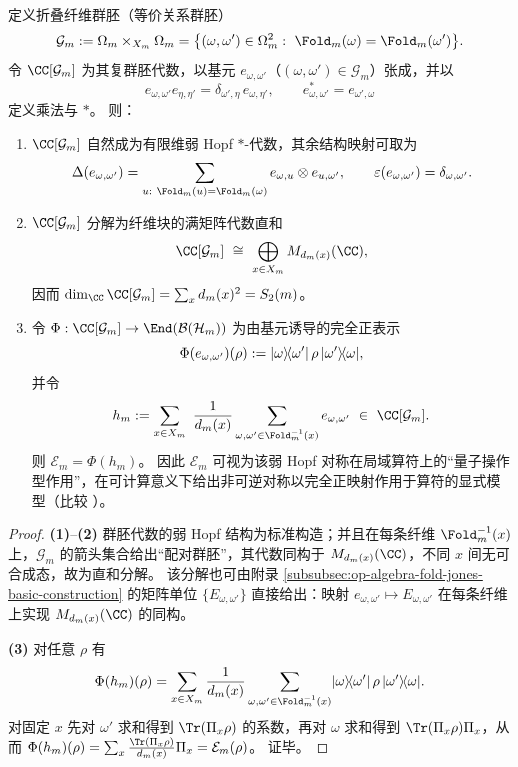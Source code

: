 \begin{theorem}\label{thm:op-algebra-fold-quantum-channel-weak-hopf-groupoid}
定义折叠纤维群胚（等价关系群胚）
\[
\mathcal{G}_m:=\Omega_m\times_{X_m}\Omega_m
=\bigl\{(\omega,\omega')\in\Omega_m^2:\ \Fold_m(\omega)=\Fold_m(\omega')\bigr\}.
\]
令 \(\CC[\mathcal{G}_m]\) 为其复群胚代数，以基元 \(e_{\omega,\omega'}\)（\((\omega,\omega')\in\mathcal{G}_m\)）张成，并以
\[
e_{\omega,\omega'}e_{\eta,\eta'}=\delta_{\omega',\eta}\,e_{\omega,\eta'},
\qquad
e_{\omega,\omega'}^\ast=e_{\omega',\omega}
\]
定义乘法与 \(\ast\)。
则：
\begin{enumerate}
  \item \(\CC[\mathcal{G}_m]\) 自然成为有限维弱 Hopf \(\ast\)-代数，其余结构映射可取为
  \[
  \Delta(e_{\omega,\omega'})=\sum_{u:\ \Fold_m(u)=\Fold_m(\omega)} e_{\omega,u}\otimes e_{u,\omega'},
  \qquad
  \varepsilon(e_{\omega,\omega'})=\delta_{\omega,\omega'}.
  \]
  \item \(\CC[\mathcal{G}_m]\) 分解为纤维块的满矩阵代数直和
  \[
  \CC[\mathcal{G}_m]\ \cong\ \bigoplus_{x\in X_m} M_{d_m(x)}(\CC),
  \]
  因而 \(\dim_{\CC}\CC[\mathcal{G}_m]=\sum_x d_m(x)^2=S_2(m)\)。
  \item 令 \(\Phi:\CC[\mathcal{G}_m]\to \End(\mathcal{B}(\mathcal{H}_m))\) 为由基元诱导的完全正表示
  \[
  \Phi(e_{\omega,\omega'})(\rho):=\lvert \omega\rangle\!\langle \omega'\rvert\,\rho\,\lvert \omega'\rangle\!\langle \omega\rvert,
  \]
  并令
  \[
  h_m:=\sum_{x\in X_m}\ \frac{1}{d_m(x)}\sum_{\omega,\omega'\in\Fold_m^{-1}(x)} e_{\omega,\omega'}\ \in\ \CC[\mathcal{G}_m].
  \]
  则 \(\mathcal{E}_m=\Phi(h_m)\)。
  因此 \(\mathcal{E}_m\) 可视为该弱 Hopf 对称在局域算符上的“量子操作型作用”，在可计算意义下给出非可逆对称以完全正映射作用于算符的显式模型（比较 \cite{OkadaTachikawa2024NonInvertibleQuantumOperations}）。
\end{enumerate}
\end{theorem}
\begin{proof}
\textbf{(1)}--\textbf{(2)} 群胚代数的弱 Hopf 结构为标准构造；并且在每条纤维 \(\Fold_m^{-1}(x)\) 上，\(\mathcal{G}_m\) 的箭头集合给出“配对群胚”，其代数同构于 \(M_{d_m(x)}(\CC)\)，不同 \(x\) 间无可合成态，故为直和分解。
该分解也可由附录 \ref{subsubsec:op-algebra-fold-jones-basic-construction} 的矩阵单位 \(\{E_{\omega,\omega'}\}\) 直接给出：映射 \(e_{\omega,\omega'}\mapsto E_{\omega,\omega'}\) 在每条纤维上实现 \(M_{d_m(x)}(\CC)\) 的同构。

\textbf{(3)} 对任意 \(\rho\) 有
\[
\Phi(h_m)(\rho)
=\sum_{x\in X_m}\frac{1}{d_m(x)}\sum_{\omega,\omega'\in\Fold_m^{-1}(x)}
\ket{\omega}\!\bra{\omega'}\,\rho\,\ket{\omega'}\!\bra{\omega}.
\]
对固定 \(x\) 先对 \(\omega'\) 求和得到 \(\Tr(\Pi_x\rho)\) 的系数，再对 \(\omega\) 求和得到 \(\Tr(\Pi_x\rho)\Pi_x\)，从而
\(
\Phi(h_m)(\rho)=\sum_x \frac{\Tr(\Pi_x\rho)}{d_m(x)}\Pi_x=\mathcal{E}_m(\rho)
\)。
证毕。
\end{proof}

